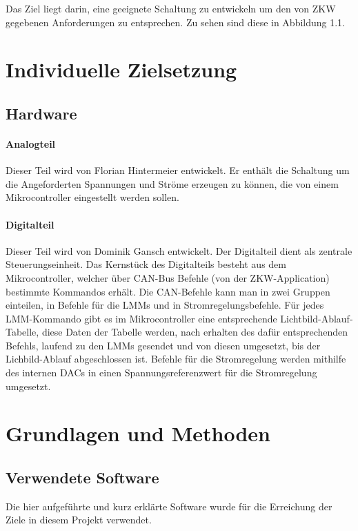\documentclass[paper=a4, 12pt]{scrreprt}
\begin{document}
	Das Ziel liegt darin, eine geeignete Schaltung zu entwickeln um den von ZKW gegebenen Anforderungen zu entsprechen. Zu sehen sind diese in Abbildung 1.1.

\chapter{Individuelle Zielsetzung}
    \section{Hardware}    	
    	\subsubsection{Analogteil}
        Dieser Teil wird von Florian Hintermeier entwickelt. Er enthält die Schaltung um die Angeforderten Spannungen und Ströme erzeugen zu können, die von einem Mikrocontroller eingestellt werden sollen.
        
        \subsubsection{Digitalteil}
        Dieser Teil wird von Dominik Gansch entwickelt. Der Digitalteil dient als zentrale Steuerungseinheit. Das Kernstück des Digitalteils besteht aus dem Mikrocontroller, welcher über CAN-Bus Befehle (von der ZKW-Application) bestimmte Kommandos erhält. Die CAN-Befehle kann man in zwei Gruppen einteilen, in Befehle für die LMMs und in Stromregelungsbefehle. Für jedes LMM-Kommando gibt es im Mikrocontroller eine entsprechende Lichtbild-Ablauf-Tabelle, diese Daten der Tabelle werden, nach erhalten des dafür entsprechenden Befehls, laufend zu den LMMs gesendet und von diesen umgesetzt, bis der Lichbild-Ablauf abgeschlossen ist. Befehle für die Stromregelung werden mithilfe des internen DACs in einen Spannungsreferenzwert für die Stromregelung umgesetzt.    

\chapter{Grundlagen und Methoden}
	\section{Verwendete Software}
	Die hier aufgeführte und kurz erklärte Software wurde für die Erreichung der Ziele in diesem Projekt verwendet.
	
\end{document}
